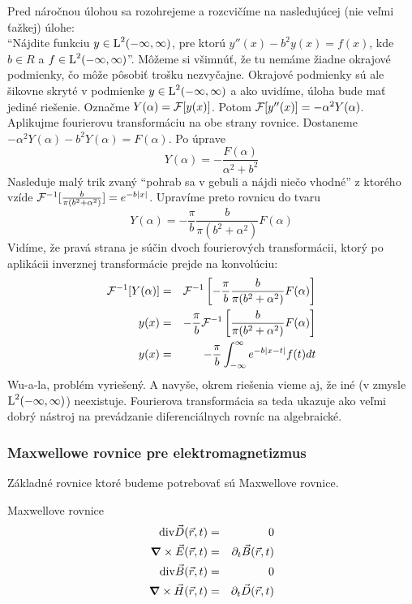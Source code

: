 Pred náročnou úlohou sa rozohrejeme a rozcvičíme na nasledujúcej (nie
veľmi ťažkej) úlohe: \\
``Nájdite funkciu $y \in \mbox{L}^2(-\infty,\infty)$, pre ktorú
$y''(x) - b^2 y(x) = f(x)$, kde $b\in R$ a $f \in \mbox{L}^2(-\infty,\infty)$''.
Môžeme si všimnúť, že tu nemáme žiadne okrajové podmienky, čo môže
pôsobiť trošku nezvyčajne. Okrajové podmienky sú ale šikovne skryté v
podmienke $y \in \mbox{L}^2(-\infty,\infty)$ a ako uvidíme, úloha bude mať jediné
riešenie.
Označme $Y(\alpha)=\mathcal{F}[y(x)]$. Potom $\mathcal{F}[y''(x)] =
-\alpha^2 Y(\alpha)$.
Aplikujme fourierovu transformáciu na obe strany rovnice.
Dostaneme $-\alpha^2 Y(\alpha) - b^2 Y(\alpha) = F(\alpha)$.
Po úprave 
\begin{equation}
    Y(\alpha)= -\frac{F(\alpha)}{\alpha^2 + b^2}
\end{equation}
Nasleduje malý trik zvaný ``pohrab sa v gebuli a nájdi niečo vhodné''
z ktorého vzíde
$\mathcal{F}^{-1}[\frac{b}{\pi(b^2+\alpha^2)}]=e^{-b|x|}$.
Upravíme preto rovnicu do tvaru
\begin{equation}
    Y(\alpha) = -\frac{\pi}{b} \frac{b}{\pi(b^2 + \alpha^2)}
    F(\alpha)
\end{equation}
Vidíme, že pravá strana je súčin dvoch fourierových transformácii,
ktorý po aplikácii inverznej transformácie prejde na konvolúciu:
\begin{eqnarray*}
    \mathcal{F}^{-1}[Y(\alpha)] &=& \mathcal{F}^{-1}\left[
            -\frac{\pi}{b} \frac{b}{\pi(b^2 + \alpha^2)}
            F(\alpha)\right] \\
    y(x) &=&  -\frac{\pi}{b} \mathcal{F}^{-1}\left[\frac{b}{\pi(b^2 +
    \alpha^2)} F(\alpha)\right] \\
    y(x) &=& -\frac{\pi}{b} \int_{-\infty}^{\infty} e^{-b |x-t|} f(t) dt
\end{eqnarray*}
Wu-a-la, problém vyriešený. A navyše, okrem riešenia vieme aj, že iné
(v zmysle $\mbox{L}^2(-\infty,\infty)$) neexistuje.
Fourierova transformácia sa teda ukazuje ako veľmi dobrý nástroj na
prevádzanie diferenciálnych rovníc na algebraické.

\subsubsection{Maxwellowe rovnice pre elektromagnetizmus}

Základné rovnice ktoré budeme potrebovať sú Maxwellove
rovnice.

\def\rt{{(\vektor{r},t)}}
\def\kw{{(\vektor{k},\omega)}}

\begin{veta} Maxwellove rovnice
\begin{eqnarray}
  \div{\vektor{D}\rt} & = & 0 \\
  \curl{\vektor{E}\rt} & = & \partial_t \vektor{B} \rt \\
  \div{\vektor{B}\rt} & = & 0 \\
  \curl{\vektor{H}\rt} & = & \partial_t \vektor{D} \rt
\end{eqnarray}
\end{veta}

